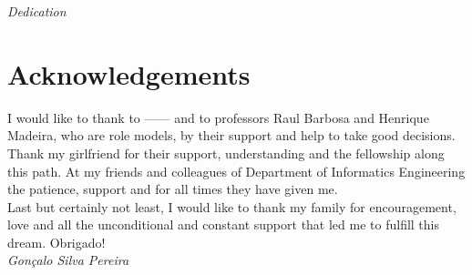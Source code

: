 

\begin{center}

\emph{Dedication}
	
\end{center}



\newpage

\section*{Acknowledgements}

I would like to thank to ------ and to professors Raul Barbosa and Henrique Madeira, who are role models, by their support and help to take good decisions.\\

Thank my girlfriend for their support, understanding and the fellowship along this path. At my friends and colleagues of Department of Informatics Engineering the patience, support and for all times they have given me. \\

Last but certainly not least, I would like to thank my family for encouragement, love and all the unconditional and constant support that led me to fulfill this dream. Obrigado!\\



\emph{\hfill Gonçalo Silva Pereira}